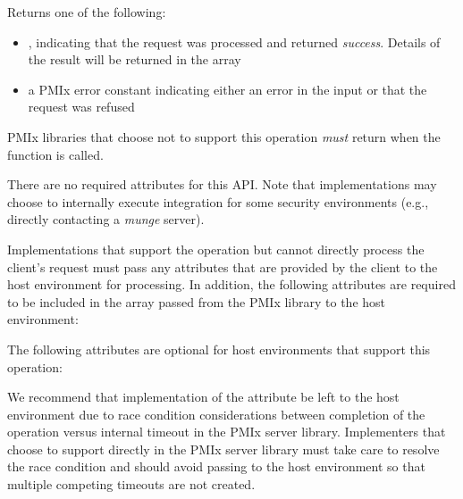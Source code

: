 \begin{arglist}
\end{arglist}

Returns one of the following:

\begin{itemize}
    \item {}, indicating that the request was processed and returned \textit{success}. Details of the result will be returned in the  array
    \item a PMIx error constant indicating either an error in the input or that the request was refused
\end{itemize}

\reqattrstart
\ac{PMIx} libraries that choose not to support this operation \textit{must} return  when the function is called.

There are no required attributes for this \ac{API}. Note that implementations may choose to internally
execute integration for some security environments (e.g., directly
contacting a \textit{munge} server).

Implementations that support the operation but cannot directly process the client's request must pass any attributes that are provided by the client to the host environment for processing. In addition, the following attributes are required to be included in the  array passed from the \ac{PMIx} library to the host environment:


\reqattrend

\optattrstart
The following attributes are optional for host environments that support this operation:


\optattrend

\adviceimplstart
We recommend that implementation of the  attribute be left to the host environment due to race condition considerations between completion of the operation versus internal timeout in the \ac{PMIx} server library. Implementers that choose to support  directly in the \ac{PMIx} server library must take care to resolve the race condition and should avoid passing  to the host environment so that multiple competing timeouts are not created.
\adviceimplend


